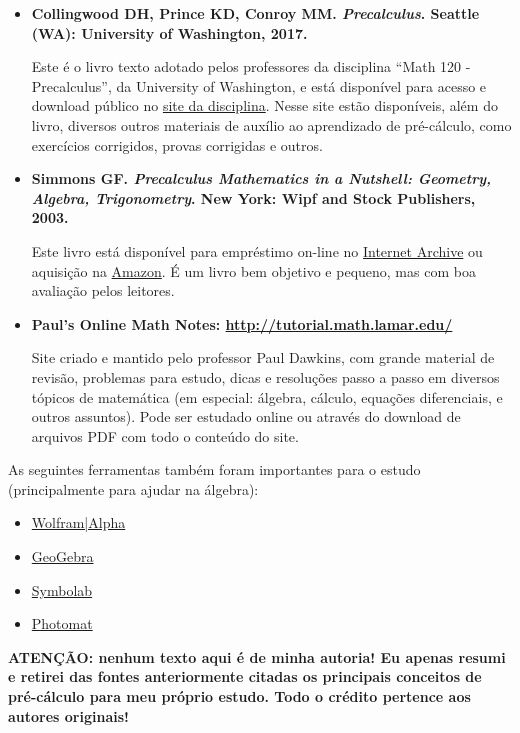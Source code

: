 \documentclass[pdftex, brazil, 12pt, twoside]{article}
\begin{document}
\begin{itemize}
\item \textbf{Collingwood DH, Prince KD, Conroy MM. \emph{Precalculus}. Seattle (WA): University
  of Washington, 2017.}

  Este é o livro texto adotado pelos professores da disciplina
  ``Math 120 - Precalculus'', da University of Washington, e está disponível para
  acesso e download público no \href{https://sites.math.washington.edu/~m120/}{site da disciplina}.
  Nesse site estão disponíveis, além do livro, diversos outros materiais de auxílio ao aprendizado
  de pré-cálculo, como exercícios corrigidos, provas corrigidas e outros.
  
\item \textbf{Simmons GF. \emph{Precalculus Mathematics in a Nutshell: Geometry, Algebra, Trigonometry}. New
  York: Wipf and Stock Publishers, 2003.}

  Este livro está disponível para empréstimo on-line
  no \href{https://archive.org/details/precalculusmathe00geor}{Internet Archive} ou
  aquisição na \href{https://www.amazon.com/Precalculus-Mathematics-Nutshell-Geometry-Trigonometry/dp/1592441300/}{Amazon}.
  É um livro bem objetivo e pequeno, mas com boa avaliação pelos leitores.

\item \textbf{Paul's Online Math Notes: \url{http://tutorial.math.lamar.edu/}}

  Site criado e mantido pelo professor Paul Dawkins, com grande material de revisão, problemas para estudo,
  dicas e resoluções passo a passo em diversos tópicos de matemática (em especial: álgebra, cálculo, equações
  diferenciais, e outros assuntos). Pode ser estudado online ou através do download de arquivos PDF com todo o
  conteúdo do site.
\end{itemize}

As seguintes ferramentas também foram importantes para o estudo (principalmente para
ajudar na álgebra):
\begin{itemize}[noitemsep]
\item \href{http://www.wolframalpha.com/}{Wolfram|Alpha}
\item \href{https://www.geogebra.org/}{GeoGebra}
\item \href{https://www.symbolab.com/}{Symbolab}
\item \href{https://photomath.net/}{Photomat}
\end{itemize}

\textbf{ATENÇÃO: nenhum texto aqui é de minha autoria! Eu apenas resumi e retirei das fontes anteriormente
citadas os principais conceitos de pré-cálculo para meu próprio estudo. Todo o crédito pertence
aos autores originais!}
\end{document}

